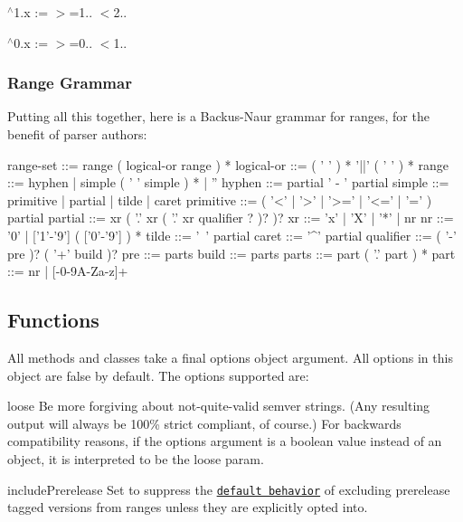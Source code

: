 \begin{DoxyItemize}
\item {\ttfamily $^\wedge$1.x} \+:= {\ttfamily $>$=1.. $<$2..}
\item {\ttfamily $^\wedge$0.x} \+:= {\ttfamily $>$=0.. $<$1..}
\end{DoxyItemize}

\subsubsection*{Range Grammar}

Putting all this together, here is a Backus-\/\+Naur grammar for ranges, for the benefit of parser authors\+:


\begin{DoxyCode}
range-set  ::= range ( logical-or range ) *
logical-or ::= ( ' ' ) * '||' ( ' ' ) *
range      ::= hyphen | simple ( ' ' simple ) * | ''
hyphen     ::= partial ' - ' partial
simple     ::= primitive | partial | tilde | caret
primitive  ::= ( '<' | '>' | '>=' | '<=' | '=' ) partial
partial    ::= xr ( '.' xr ( '.' xr qualifier ? )? )?
xr         ::= 'x' | 'X' | '*' | nr
nr         ::= '0' | ['1'-'9'] ( ['0'-'9'] ) *
tilde      ::= '~' partial
caret      ::= '^' partial
qualifier  ::= ( '-' pre )? ( '+' build )?
pre        ::= parts
build      ::= parts
parts      ::= part ( '.' part ) *
part       ::= nr | [-0-9A-Za-z]+
\end{DoxyCode}


\subsection*{Functions}

All methods and classes take a final {\ttfamily options} object argument. All options in this object are {\ttfamily false} by default. The options supported are\+:


\begin{DoxyItemize}
\item {\ttfamily loose} Be more forgiving about not-\/quite-\/valid semver strings. (Any resulting output will always be 100\% strict compliant, of course.) For backwards compatibility reasons, if the {\ttfamily options} argument is a boolean value instead of an object, it is interpreted to be the {\ttfamily loose} param.
\item {\ttfamily include\+Prerelease} Set to suppress the \href{https://github.com/npm/node-semver#prerelease-tags}{\tt default behavior} of excluding prerelease tagged versions from ranges unless they are explicitly opted into.
\end{DoxyItemize}

